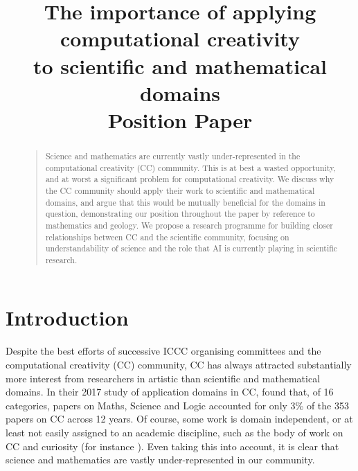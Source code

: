 \documentclass[letterpaper]{article}
\title{The importance of applying computational creativity\\ to
  scientific and mathematical domains\\
Position Paper}
\begin{document}
\maketitle
\begin{abstract}
\begin{quote}
  Science and mathematics are currently vastly under-represented in
  the computational creativity (CC) community. This is at best a
  wasted opportunity, and at worst a significant problem for
  computational creativity. We discuss why the CC community should
  apply their work to scientific and mathematical domains, and argue
  that this would be mutually beneficial for the domains in question,
  demonstrating our position throughout the paper by reference to
  mathematics and geology. We propose a research programme for
  building closer relationships between CC and the scientific
  community, focusing on understandability of science and the role
  that AI is currently playing in scientific research.
\end{quote}
\end{abstract}

\section{Introduction}

Despite the best efforts of successive ICCC organising committees and
the computational creativity (CC) community, CC has always attracted
substantially more interest from researchers in artistic than
scientific and mathematical domains. In their 2017 study of
application domains in CC, \cite{loughran17} found that, of 16
categories, papers on Maths, Science and Logic accounted for only 3\%
of the 353 papers on CC across 12 years. Of course, some work is
domain independent, or at least not easily assigned to an academic
discipline, such as the body of work on CC and curiosity (for instance
\cite{grace}). Even taking this into account, it is clear that science
and mathematics are vastly under-represented in our community.
\end{document}
